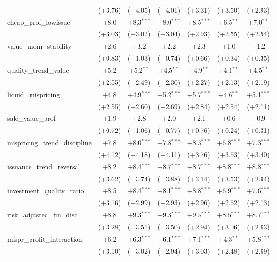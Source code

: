 \begin{table}[htbp]
\begin{threeparttable}
\begin{tabular}{lcccccc}
 & (+3.76) & (+4.05) & (+4.01) & (+3.31) & (+3.50) & (+2.93) \\
\addlinespace
cheap\_prof\_lowissue & +8.0 & +8.3$^{***}$ & +8.0$^{***}$ & +8.5$^{***}$ & +6.5$^{**}$ & +7.0$^{**}$ \\
 & (+3.03) & (+3.02) & (+3.04) & (+2.93) & (+2.55) & (+2.54) \\
\addlinespace
value\_mom\_stability & +2.6 & +3.2 & +2.2 & +2.3 & +1.0 & +1.2 \\
 & (+0.83) & (+1.03) & (+0.74) & (+0.66) & (+0.34) & (+0.35) \\
\addlinespace
quality\_trend\_value & +5.2 & +5.2$^{**}$ & +4.5$^{**}$ & +4.9$^{**}$ & +4.1$^{**}$ & +4.5$^{**}$ \\
 & (+2.55) & (+2.49) & (+2.30) & (+2.27) & (+2.13) & (+2.19) \\
\addlinespace
liquid\_mispricing & +4.8 & +4.9$^{***}$ & +5.2$^{***}$ & +5.7$^{***}$ & +4.6$^{**}$ & +5.1$^{***}$ \\
 & (+2.55) & (+2.60) & (+2.69) & (+2.84) & (+2.54) & (+2.71) \\
\addlinespace
safe\_value\_prof & +1.9 & +2.8 & +2.0 & +2.1 & +0.6 & +0.9 \\
 & (+0.72) & (+1.06) & (+0.77) & (+0.76) & (+0.24) & (+0.31) \\
\addlinespace
mispricing\_trend\_discipline & +7.8 & +8.0$^{***}$ & +7.8$^{***}$ & +8.3$^{***}$ & +6.8$^{***}$ & +7.3$^{***}$ \\
 & (+4.12) & (+4.18) & (+4.11) & (+3.76) & (+3.63) & (+3.40) \\
\addlinespace
issuance\_trend\_reversal & +8.2 & +8.4$^{***}$ & +8.7$^{***}$ & +8.7$^{***}$ & +8.8$^{***}$ & +8.8$^{***}$ \\
 & (+3.62) & (+3.74) & (+3.88) & (+3.14) & (+3.53) & (+2.94) \\
\addlinespace
investment\_quality\_ratio & +8.5 & +8.4$^{***}$ & +8.1$^{***}$ & +8.8$^{***}$ & +6.9$^{***}$ & +7.6$^{***}$ \\
 & (+3.16) & (+2.99) & (+2.93) & (+2.96) & (+2.62) & (+2.73) \\
\addlinespace
risk\_adjusted\_fin\_disc & +8.8 & +9.3$^{***}$ & +9.3$^{***}$ & +9.5$^{***}$ & +8.5$^{***}$ & +8.7$^{***}$ \\
 & (+3.28) & (+3.51) & (+3.50) & (+2.94) & (+3.06) & (+2.63) \\
\addlinespace
mispr\_profit\_interaction & +6.2 & +6.3$^{***}$ & +6.1$^{***}$ & +7.1$^{***}$ & +4.8$^{**}$ & +5.8$^{***}$ \\
 & (+3.10) & (+3.02) & (+2.94) & (+3.03) & (+2.48) & (+2.69) \\

\end{tabular}
\end{threeparttable}
\end{table}
